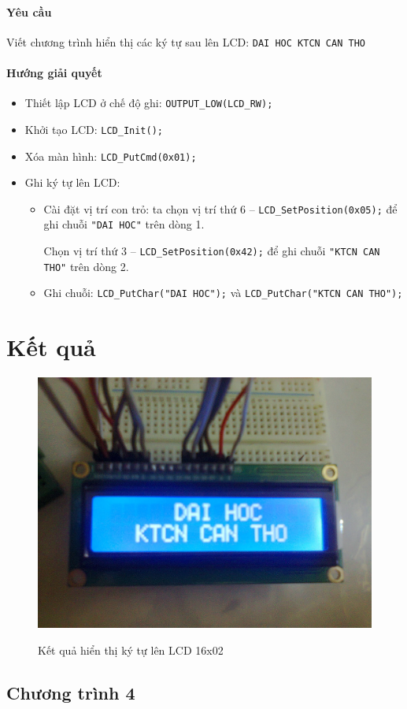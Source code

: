 \paragraph{Yêu cầu}Viết chương trình hiển thị các ký tự sau lên LCD: \verb|DAI HOC KTCN CAN THO|
\paragraph{Hướng giải quyết}
\begin{itemize}
\item Thiết lập LCD ở chế độ ghi: \verb|OUTPUT_LOW(LCD_RW);|
\item Khởi tạo LCD: \verb|LCD_Init();|
\item Xóa màn hình: \verb|LCD_PutCmd(0x01);|
\item Ghi ký tự lên LCD:
\begin{itemize}
\item Cài đặt vị trí con trỏ: ta chọn vị trí thứ 6 -- \verb|LCD_SetPosition(0x05);| để ghi chuỗi \verb|"DAI HOC"| trên dòng 1.

Chọn vị trí thứ 3 -- \verb|LCD_SetPosition(0x42);| để ghi chuỗi \verb|"KTCN CAN THO"| trên dòng 2.
\item Ghi chuỗi: \verb|LCD_PutChar("DAI HOC");| và \verb|LCD_PutChar("KTCN CAN THO");|
\end{itemize}
\end{itemize}
\newpage
\section*{Kết quả}
\begin{figure}[!h]
\begin{center}
  {\includegraphics[width=.5\linewidth]{bai-2/image/2-1}}
\end{center}
\caption{Kết quả hiển thị ký tự lên LCD 16x02}
\end{figure}
\subsection*{Chương trình 4}

